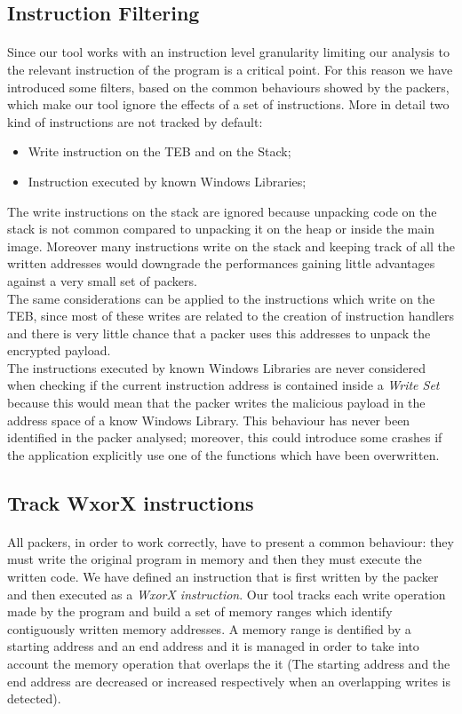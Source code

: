 \subsection{Instruction Filtering}
\paragraph{}
Since our tool works with an instruction level granularity limiting our analysis to the relevant instruction of the program is a critical point. For this reason we have introduced some filters, based on the common behaviours showed by the packers, which make our tool ignore the effects of a set of instructions. More in detail two kind of instructions are not tracked by default:
\begin{itemize}
	\item Write instruction on the TEB and on the Stack;
	\item Instruction executed by known Windows Libraries;
\end{itemize}
The write instructions on the stack are ignored because unpacking code on the stack is not common compared to unpacking it on the heap or inside the main image. Moreover many instructions write on the stack and keeping track of all the written addresses would downgrade the performances gaining little advantages against a very small set of packers.\\
The same considerations can be applied to the instructions which write on the TEB, since most of these writes are related to the creation of instruction handlers and there is very little chance that a packer uses this addresses to unpack the encrypted payload.\\
The instructions executed by known Windows Libraries are never considered when checking if the current instruction address is contained inside a \textit{Write Set} because this would mean that the packer writes the malicious payload in the address space of a know Windows Library. This behaviour has never been identified in the packer analysed; moreover, this could introduce some crashes if the application explicitly use one of the functions which have been overwritten.

\subsection{Track WxorX instructions}
\paragraph{}
All packers, in order to work correctly, have to present a common behaviour: they must write the original program in memory and then they must execute the written code. We have defined an instruction that is first written by the packer and then executed as a \textit{WxorX instruction}.
Our tool tracks each write operation made by the program and build a set of memory ranges which identify contiguously written memory addresses. A memory range is dentified by a starting address and an end address and it is managed in order to take into account the memory operation that overlaps the it (The starting address and the end address are decreased or increased 
respectively when an overlapping writes is detected).

